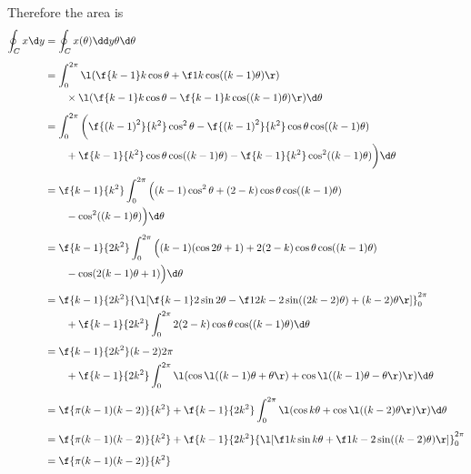 \documentclass[a4paper]{article}
\begin{document}
Therefore the area is \begin{align*}
\oint_C x \d y &= \oint_C x(\theta) \dd y\theta \d \theta \\[1ex]
&= \int_0^{2\pi} \l(
    \f{k-1}k \cos \theta + \f1k \cos ((k-1) \theta) \r)
    \\ &\qquad \times \l(
        \f{k-1}k \cos \theta
        - \f{k-1}k \cos ((k-1) \theta)
    \r) \d \theta \\[1ex]
%
&= \int_0^{2\pi} \bigg(
    \f{{(k-1)}^2}{k^2} \cos^2 \theta
    - \f{{(k-1)}^2}{k^2} \cos \theta \cos ((k-1) \theta)
    \\ &\qquad + \f{k-1}{k^2} \cos \theta \cos ((k-1) \theta)
    - \f{k-1}{k^2} \cos^2 ((k-1) \theta)
\bigg) \d \theta \\[1ex]
%
&= \f{k-1}{k^2} \int_0^{2\pi} \Big(
    (k-1) \cos^2 \theta
    + (2-k) \cos \theta \cos ((k-1) \theta)
    \\ &\qquad - \cos^2 ((k-1) \theta)
\Big) \d \theta \\[1ex]
%
&= \f{k-1}{2k^2} \int_0^{2\pi} \Big(
    (k-1) (\cos 2\theta + 1)
    + 2(2-k) \cos \theta \cos ((k-1) \theta)
    \\ &\qquad - \cos (2(k-1) \theta + 1)
\Big) \d \theta \\[1ex]
%
&= \f{k-1}{2k^2} {\l[
    \f{k-1}2 \sin 2\theta
    - \f1{2k-2} \sin ((2k-2) \theta)
    + (k-2) \theta
\r]}_0^{2\pi}
    \\ &\qquad + \f{k-1}{2k^2} \int_0^{2\pi}
        2(2-k) \cos \theta \cos ((k-1) \theta)
    \d \theta \\[1ex]
%
&= \f{k-1}{2k^2} (k-2) 2\pi
    \\ &\qquad + \f{k-1}{2k^2} \int_0^{2\pi} \l(
        \cos \l( (k-1) \theta + \theta \r) + \cos \l( (k-1) \theta - \theta \r)
    \r) \d \theta \\[1ex]
%
&= \f{\pi (k-1) (k-2)}{k^2}
    + \f{k-1}{2k^2} \int_0^{2\pi} \l(
        \cos k \theta + \cos \l( (k-2) \theta \r)
    \r) \d \theta \\[1ex]
%
&= \f{\pi (k-1) (k-2)}{k^2}
    + \f{k-1}{2k^2} {\l[ \f1k \sin k \theta + \f1{k-2} \sin ((k-2) \theta) \r]}_0^{2\pi} \\[1ex]
%
&= \f{\pi (k-1) (k-2)}{k^2}
\end{align*}

\end{document}
